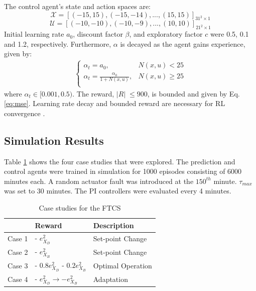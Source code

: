 The control agent's state and action spaces are:
\begin{equation}
{\mathcal{X}} = [(-15, 15), (-15, -14), ..., (15, 15)]_{31^2 \times 1}
\label{eq:states_case_study}
\end{equation}
\begin{equation}
{\mathcal{U}} = [(-10, -10), (-10, -9), ..., (10, 10)]_{21^2 \times 1}
\label{eq:actions_case_study}
\end{equation}
Initial learning rate $a_0$, discount factor $\beta$, and exploratory factor $c$ were 0.5, 0.1 and 1.2, respectively.  Furthermore, $\alpha$ is decayed as the agent gains experience, given by:
\begin{eqnarray}
\left\{
\begin{matrix}
    \alpha_t = a_0, & N(x, u) < 25 \\
    \alpha _t = \frac{\alpha_0}{1 + N(x, u)}, & N(x, u) \geq 25 \\
\end{matrix} \right.
\label{eq:learning_rate}
\end{eqnarray}
where $\alpha_t \in [0.001, 0.5)$. The reward, $|R| \; \leq 900$, is bounded and given by Eq. \ref{eq:mse}.  Learning rate decay and bounded reward are necessary for RL convergence \cite{convergence_rl_ref20}.
\subsection{Simulation Results}
Table \ref{tab:case_studies} shows the four case studies that were explored.  The prediction and control agents were trained in simulation for 1000 episodes consisting of 6000 minutes each. A random actuator fault was introduced at the $150^{th}$ minute. $\tau_{max}$ was set to 30 minutes.  The PI controllers were evaluated every 4 minutes.
\begin{table}[htb]
	\begin{center}
		\caption{\label{tab:case_studies} Case studies for the FTCS}
	\def\arraystretch{1.3}
	\begin{tabular}{p{1.8cm}p{4cm}p{5cm}}
	\hline
	 & Reward & Description \\
	 \hline
	 Case 1 & - $e_{X_D}^2$ & Set-point Change \\
	 Case 2 & - $e_{X_B}^2$ & Set-point Change \\
	 Case 3 & - $0.8e_{X_D}^2$ - $0.2e_{X_B}^2$ & Optimal Operation \\
	 Case 4 & - $e_{X_D}^2  \rightarrow - e_{X_B}^2$ & Adaptation \\
	\hline
	\end{tabular}
	\end{center}
\end{table}

